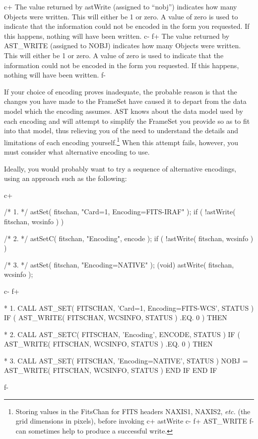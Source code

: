 \documentclass[twoside,11pt]{starlink}
\begin{document}
c+
The value returned by astWrite (assigned to ``nobj'') indicates how
many Objects were written. This will either be 1 or zero. A value of
zero is used to indicate that the information could not be encoded in
the form you requested. If this happens, nothing will have been
written.
c-
f+
The value returned by AST\_WRITE (assigned to NOBJ) indicates how many
Objects were written. This will either be 1 or zero. A value of zero
is used to indicate that the information could not be encoded in the
form you requested. If this happens, nothing will have been written.
f-

If your choice of encoding proves inadequate, the probable reason is
that the changes you have made to the FrameSet have caused it to
depart from the data model which the encoding assumes.  AST knows
about the data model used by each encoding and will attempt to
simplify the FrameSet you provide so as to fit into that model, thus
relieving you of the need to understand the details and limitations of
each encoding yourself.\footnote{Storing values in the FitsChan for
FITS headers NAXIS1, NAXIS2, \emph{etc.} (the grid dimensions in pixels),
before invoking
c+
astWrite
c-
f+
AST\_WRITE
f-
can sometimes help to produce a successful write.} When this attempt fails,
however, you must consider what alternative encoding to use.

Ideally, you would probably want to try a sequence of alternative
encodings, using an approach such as the following:

c+
\small
\begin{terminalv}
/* 1. */
astSet( fitschan, "Card=1, Encoding=FITS-IRAF" );
if ( !astWrite( fitschan, wcsinfo ) ) {

/* 2. */
   astSetC( fitschan, "Encoding", encode );
   if ( !astWrite( fitschan, wcsinfo ) ) {

/* 3. */
      astSet( fitschan, "Encoding=NATIVE" );
      (void) astWrite( fitschan, wcsinfo );
   }
}
\end{terminalv}
\normalsize
c-
f+
\small
\begin{terminalv}
*  1.
      CALL AST_SET( FITSCHAN, 'Card=1, Encoding=FITS-WCS', STATUS )
      IF ( AST_WRITE( FITSCHAN, WCSINFO, STATUS ) .EQ. 0 ) THEN

*  2.
         CALL AST_SETC( FITSCHAN, 'Encoding', ENCODE, STATUS )
         IF ( AST_WRITE( FITSCHAN, WCSINFO, STATUS ) .EQ. 0 ) THEN

*  3.
            CALL AST_SET( FITSCHAN, 'Encoding=NATIVE', STATUS )
            NOBJ = AST_WRITE( FITSCHAN, WCSINFO, STATUS )
         END IF
      END IF
\end{terminalv}
\normalsize
f-
\end{document}
